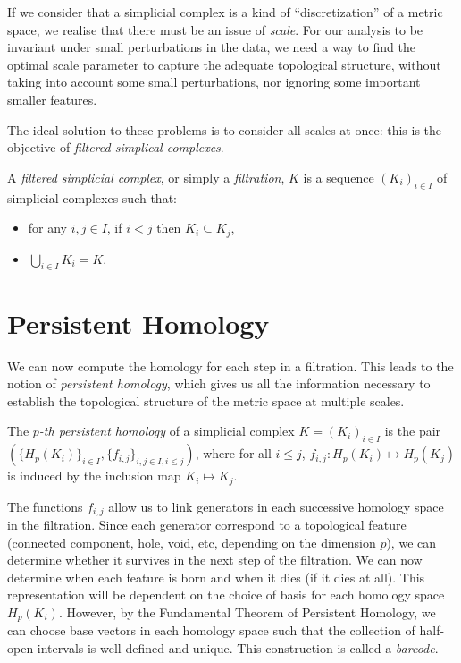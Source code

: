 \documentclass[a4paper,11pt,openany,extrafontsizes]{memoir}
\begin{document}
If we consider that a simplicial complex is a kind of
``discretization'' of a metric space, we realise that there must be an
issue of \emph{scale}. For our analysis to be invariant under small
perturbations in the data, we need a way to find the optimal scale
parameter to capture the adequate topological structure, without
taking into account some small perturbations, nor ignoring some
important smaller features.


The ideal solution to these problems is to consider all scales at
once: this is the objective of \emph{filtered simplical complexes}.

\begin{defn}[Filtration]
  A \emph{filtered simplicial complex}, or simply a \emph{filtration},
  $K$ is a sequence ${(K_i)}_{i\in I}$ of simplicial complexes such
  that:
  \begin{itemize}
  \item for any $i, j \in I$, if $i < j$ then $K_i \subseteq K_j$,
  \item $\bigcup_{i\in I} K_i = K$.
  \end{itemize}
\end{defn}

\section{Persistent Homology}%
\label{sec:persistent-homology}

We can now compute the homology for each step in a filtration. This
leads to the notion of \emph{persistent homology}, which gives us all
the information necessary to establish the topological structure of
the metric space at multiple scales.

\begin{defn}
  The \emph{$p$-th persistent homology} of a simplicial complex
  $K = {(K_i)}_{i\in I}$ is the pair
  $(\{H_p(K_i)\}_{i\in I}, \{f_{i,j}\}_{i,j\in I, i\leq j})$, where
  for all $i\leq j$, $f_{i,j} : H_p(K_i) \mapsto H_p(K_j)$ is induced
  by the inclusion map $K_i \mapsto K_j$.
\end{defn}

The functions $f_{i,j}$ allow us to link generators in each successive
homology space in the filtration. Since each generator correspond to a
topological feature (connected component, hole, void, etc, depending
on the dimension $p$), we can determine whether it survives in the
next step of the filtration. We can now determine when each feature is
born and when it dies (if it dies at all). This representation will be
dependent on the choice of basis for each homology space
$H_p(K_i)$. However, by the Fundamental Theorem of Persistent
Homology, we can choose base vectors in each homology space such that
the collection of half-open intervals is well-defined and unique. This
construction is called a \emph{barcode}.
\end{document}
